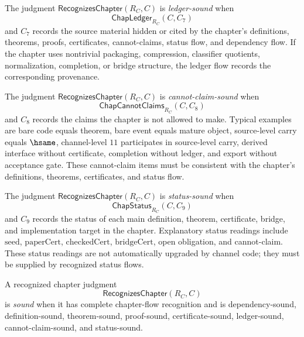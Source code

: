 \begin{definition}
\label{def:chapter-generated-ledger-sound}
The judgment $\mathsf{RecognizesChapter}(R_C,C)$ is \emph{ledger-sound} when
$$
  \mathsf{ChapLedger}_{R_C}(C,C_7)
$$
and $C_7$ records the source material hidden or cited by the chapter's definitions, theorems, proofs, certificates, cannot-claims, status flow, and dependency flow. If the chapter uses nontrivial packaging, compression, classifier quotients, normalization, completion, or bridge structure, the ledger flow records the corresponding provenance.
\end{definition}

\begin{definition}
\label{def:chapter-generated-cannot-claim-sound}
The judgment $\mathsf{RecognizesChapter}(R_C,C)$ is \emph{cannot-claim-sound} when
$$
  \mathsf{ChapCannotClaims}_{R_C}(C,C_8)
$$
and $C_8$ records the claims the chapter is not allowed to make. Typical examples are bare code equals theorem, bare event equals mature object, source-level carry equals $\hsame$, channel-level $11$ participates in source-level carry, derived interface without certificate, completion without ledger, and export without acceptance gate. These cannot-claim items must be consistent with the chapter's definitions, theorems, certificates, and status flow.
\end{definition}

\begin{definition}
\label{def:chapter-generated-status-sound}
The judgment $\mathsf{RecognizesChapter}(R_C,C)$ is \emph{status-sound} when
$$
  \mathsf{ChapStatus}_{R_C}(C,C_9)
$$
and $C_9$ records the status of each main definition, theorem, certificate, bridge, and implementation target in the chapter. Explanatory status readings include $\mathrm{seed}$, $\mathrm{paperCert}$, $\mathrm{checkedCert}$, $\mathrm{bridgeCert}$, open obligation, and cannot-claim. These status readings are not automatically upgraded by channel code; they must be supplied by recognized status flows.
\end{definition}

\begin{definition}
\label{def:chapter-generated-sound-recognized-flow}
A recognized chapter judgment
$$
  \mathsf{RecognizesChapter}(R_C,C)
$$
is \emph{sound} when it has complete chapter-flow recognition and is dependency-sound, definition-sound, theorem-sound, proof-sound, certificate-sound, ledger-sound, cannot-claim-sound, and status-sound.
\end{definition}

